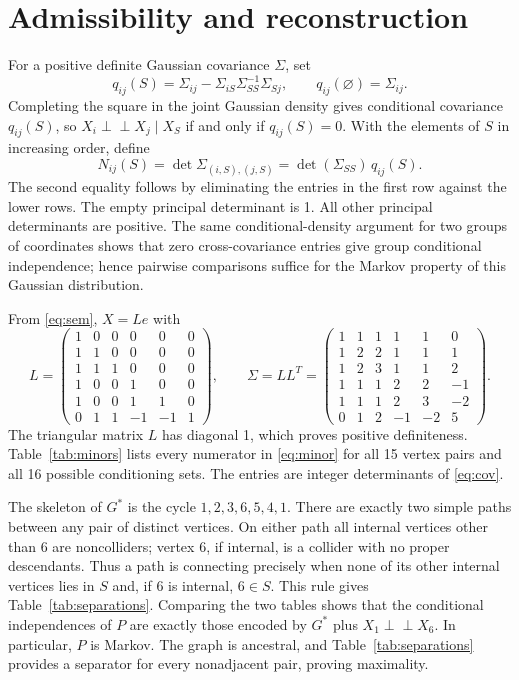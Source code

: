 \documentclass[11pt]{article}
\newcommand{\indep}{\mathrel{\perp\!\!\!\perp}}
\begin{document}
\section{Admissibility and reconstruction}\label{sec:admissibility}
For a positive definite Gaussian covariance $\Sigma$, set
\[
q_{ij}(S)=\Sigma_{ij}-\Sigma_{iS}\Sigma_{SS}^{-1}\Sigma_{Sj},
\qquad q_{ij}(\varnothing)=\Sigma_{ij}.
\]
Completing the square in the joint Gaussian density gives conditional
covariance $q_{ij}(S)$, so $X_i\indep X_j\mid X_S$ if and only if
$q_{ij}(S)=0$. With the elements of $S$ in increasing order, define
\begin{equation}\label{eq:minor}
N_{ij}(S)=\det\Sigma_{(i,S),(j,S)}
          =\det(\Sigma_{SS})\,q_{ij}(S).
\end{equation}
The second equality follows by eliminating the entries in the first row
against the lower rows. The empty principal determinant is 1. All other
principal determinants are positive. The same conditional-density argument
for two groups of coordinates shows that zero cross-covariance entries
give group conditional independence; hence pairwise comparisons suffice
for the Markov property of this Gaussian distribution.

From \eqref{eq:sem}, $X=Le$ with
\begin{equation}\label{eq:cov}
L=\begin{pmatrix}
1&0&0&0&0&0\\1&1&0&0&0&0\\1&1&1&0&0&0\\
1&0&0&1&0&0\\1&0&0&1&1&0\\0&1&1&-1&-1&1
\end{pmatrix},\qquad
\Sigma=LL^T=\begin{pmatrix}
1&1&1&1&1&0\\1&2&2&1&1&1\\1&2&3&1&1&2\\
1&1&1&2&2&-1\\1&1&1&2&3&-2\\0&1&2&-1&-2&5
\end{pmatrix}.
\end{equation}
The triangular matrix $L$ has diagonal 1, which proves positive definiteness.
Table~\ref{tab:minors} lists every numerator in \eqref{eq:minor} for all
15 vertex pairs and all 16 possible conditioning sets. The entries are
integer determinants of \eqref{eq:cov}.

The skeleton of $G^*$ is the cycle $1,2,3,6,5,4,1$. There are exactly two
simple paths between any pair of distinct vertices. On either path all
internal vertices other than 6 are noncolliders; vertex 6, if internal, is
a collider with no proper descendants. Thus a path is connecting precisely
when none of its other internal vertices lies in $S$ and, if 6 is internal,
$6\in S$. This rule gives Table~\ref{tab:separations}. Comparing the two
tables shows that the conditional independences of $P$ are exactly those
encoded by $G^*$ plus $X_1\indep X_6$. In particular, $P$ is Markov.
The graph is ancestral, and Table~\ref{tab:separations} provides a separator
for every nonadjacent pair, proving maximality.
\end{document}
